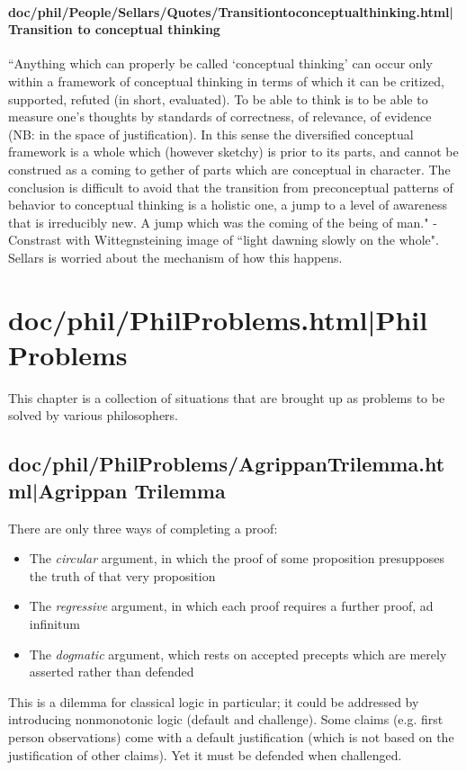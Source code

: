 \documentclass[12pt,a4paper]{report}
\begin{document}
\subsubsection{doc/phil/People/Sellars/Quotes/Transitiontoconceptualthinking.html|Transition to conceptual thinking}
``Anything which can properly be called `conceptual thinking' can occur only within a framework of conceptual thinking in terms of which it can be critized, supported, refuted (in short, evaluated). To be able to think is to be able to measure one's thoughts by standards of correctness, of relevance, of evidence (NB: in the space of justification). In this sense the diversified conceptual framework is a whole which (however sketchy) is prior to its parts, and cannot be construed as a coming to gether of parts which are conceptual in character. The conclusion is difficult to avoid that the transition from preconceptual patterns of behavior to conceptual thinking is a holistic one, a jump to a level of awareness that is irreducibly new. A jump which was the coming of the being of man." - Constrast with Wittegnsteining image of ``light dawning slowly on the whole". Sellars is worried about the mechanism of how this happens.

\chapter{doc/phil/PhilProblems.html|Phil Problems}
This chapter is a collection of situations that are brought up as problems to be solved by various philosophers.

\section{doc/phil/PhilProblems/AgrippanTrilemma.html|Agrippan Trilemma}
There are only three ways of completing a proof:
\begin{itemize}
    \item The \emph{circular} argument, in which the proof of some proposition presupposes the truth of that very proposition
    \item The \emph{regressive} argument, in which each proof requires a further proof, ad infinitum
    \item The \emph{dogmatic} argument, which rests on accepted precepts which are merely asserted rather than defended
\end{itemize}

This is a dilemma for classical logic in particular; it could be addressed by introducing nonmonotonic logic (default and challenge). Some claims (e.g. first person observations) come with a default justification (which is not based on the justification of other claims). Yet it must be defended when challenged.
\end{document}
